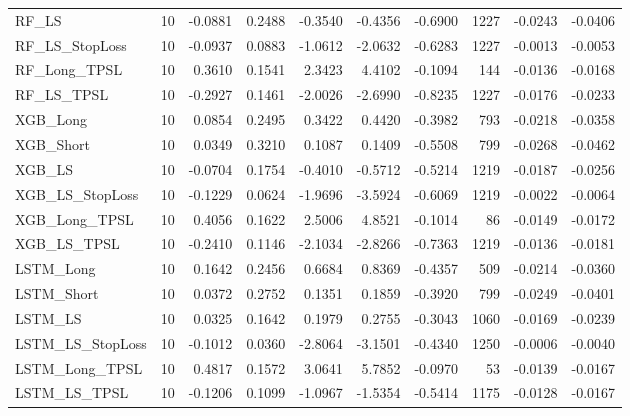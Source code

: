 \begin{tabular}{llrrrrrrrr}
RF\_LS & 10 & -0.0881 & 0.2488 & -0.3540 & -0.4356 & -0.6900 & 1227 & -0.0243 & -0.0406 \\
\cline{1-10}
RF\_LS\_StopLoss & 10 & -0.0937 & 0.0883 & -1.0612 & -2.0632 & -0.6283 & 1227 & -0.0013 & -0.0053 \\
\cline{1-10}
RF\_Long\_TPSL & 10 & 0.3610 & 0.1541 & 2.3423 & 4.4102 & -0.1094 & 144 & -0.0136 & -0.0168 \\
\cline{1-10}
RF\_LS\_TPSL & 10 & -0.2927 & 0.1461 & -2.0026 & -2.6990 & -0.8235 & 1227 & -0.0176 & -0.0233 \\
\cline{1-10}
XGB\_Long & 10 & 0.0854 & 0.2495 & 0.3422 & 0.4420 & -0.3982 & 793 & -0.0218 & -0.0358 \\
\cline{1-10}
XGB\_Short & 10 & 0.0349 & 0.3210 & 0.1087 & 0.1409 & -0.5508 & 799 & -0.0268 & -0.0462 \\
\cline{1-10}
XGB\_LS & 10 & -0.0704 & 0.1754 & -0.4010 & -0.5712 & -0.5214 & 1219 & -0.0187 & -0.0256 \\
\cline{1-10}
XGB\_LS\_StopLoss & 10 & -0.1229 & 0.0624 & -1.9696 & -3.5924 & -0.6069 & 1219 & -0.0022 & -0.0064 \\
\cline{1-10}
XGB\_Long\_TPSL & 10 & 0.4056 & 0.1622 & 2.5006 & 4.8521 & -0.1014 & 86 & -0.0149 & -0.0172 \\
\cline{1-10}
XGB\_LS\_TPSL & 10 & -0.2410 & 0.1146 & -2.1034 & -2.8266 & -0.7363 & 1219 & -0.0136 & -0.0181 \\
\cline{1-10}
LSTM\_Long & 10 & 0.1642 & 0.2456 & 0.6684 & 0.8369 & -0.4357 & 509 & -0.0214 & -0.0360 \\
\cline{1-10}
LSTM\_Short & 10 & 0.0372 & 0.2752 & 0.1351 & 0.1859 & -0.3920 & 799 & -0.0249 & -0.0401 \\
\cline{1-10}
LSTM\_LS & 10 & 0.0325 & 0.1642 & 0.1979 & 0.2755 & -0.3043 & 1060 & -0.0169 & -0.0239 \\
\cline{1-10}
LSTM\_LS\_StopLoss & 10 & -0.1012 & 0.0360 & -2.8064 & -3.1501 & -0.4340 & 1250 & -0.0006 & -0.0040 \\
\cline{1-10}
LSTM\_Long\_TPSL & 10 & 0.4817 & 0.1572 & 3.0641 & 5.7852 & -0.0970 & 53 & -0.0139 & -0.0167 \\
\cline{1-10}
LSTM\_LS\_TPSL & 10 & -0.1206 & 0.1099 & -1.0967 & -1.5354 & -0.5414 & 1175 & -0.0128 & -0.0167 \\
\cline{1-10}
\bottomrule
\end{tabular}
